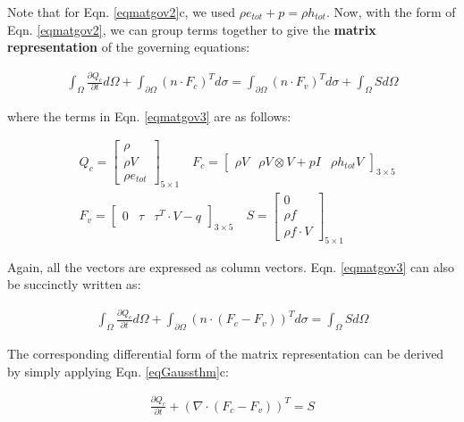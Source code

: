 \documentclass[12pt, letterpaper]{report}
\begin{document}
Note that for Eqn. \ref{eqmatgov2}c, we used $\rho e_{tot} + p = \rho h_{tot}$. Now, with the form
of Eqn. \ref{eqmatgov2}, we can group terms together to give the {\bf matrix representation} of the
governing equations:

\begin{align}\label{eqmatgov3}
   \int_{\Omega}\frac{\partial Q_c}{\partial t}d\Omega +  \int_{\partial \Omega} (n \cdot F_c)^T
   d\sigma = \int_{\partial \Omega} (n \cdot F_v)^T d\sigma + \int_{\Omega} S d\Omega
\end{align}

where the terms in Eqn. \ref{eqmatgov3} are as follows:

\begin{align*}
   &Q_c = \begin{bmatrix} 
      \rho \\
      \rho V \\
      \rho e_{tot}
   \end{bmatrix}_{5\times1} \quad 
   F_c = \begin{bmatrix} \rho V & \rho V\mathop{\otimes}V + pI & \rho h_{tot} V
      \end{bmatrix}_{3\times5} \\
      &F_v = \begin{bmatrix}0 & \tau & \tau^T \cdot V -
   q\end{bmatrix}_{3\times5} \quad S = \begin{bmatrix}
      0 \\
      \rho f \\
      \rho f \cdot V
      \end{bmatrix}_{5\times1}
\end{align*}

Again, all the vectors are expressed as column vectors. Eqn. \ref{eqmatgov3} can also be succinctly
written as:

\begin{align}\label{eqmatgov}
   \int_{\Omega}\frac{\partial Q_c}{\partial t}d\Omega +  \int_{\partial \Omega} (n \cdot (F_c -
   F_v))^T d\sigma = \int_{\Omega} S d\Omega
\end{align}

The corresponding differential form of the matrix representation can be derived by simply applying
Eqn. \ref{eqGaussthm}c:

\begin{align}\label{eqmatgovDf}
   \frac{\partial Q_c}{\partial t} + (\nabla \cdot (F_c - F_v))^T = S
\end{align}
\end{document}
